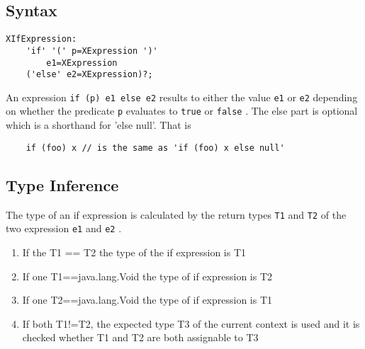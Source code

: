 \documentclass[a4paper,10pt]{scrreprt}
\newlength{\itemindentlen}
\begin{document}
\subsection{Syntax}
\begin{lstlisting}
XIfExpression:
	'if' '(' p=XExpression ')'
		e1=XExpression
	('else' e2=XExpression)?;

\end{lstlisting}


An expression \lstinline{if (p) e1 else e2}
 results to either the value \lstinline{e1}
 or \lstinline{e2}
 depending on whether the predicate \lstinline{p}
 evaluates to \lstinline{true}
 or \lstinline{false}
. 
The else part is optional which is a shorthand for 'else null'.
That is 
\begin{lstlisting}
	if (foo) x // is the same as 'if (foo) x else null' 

\end{lstlisting}





\subsection{Type Inference\label{IfTypeInference}}
The type of an if expression is calculated by the return types \lstinline{T1}
 and \lstinline{T2}
 of the two expression \lstinline{e1}
 and \lstinline{e2}
.

\setlength{\itemindentlen}{\textwidth}
\begin{enumerate}
\addtolength{\itemindentlen}{-2em}

\item \begin{minipage}[t]{\itemindentlen}
If the T1 == T2 the type of the if expression is T1
\end{minipage}

\item \begin{minipage}[t]{\itemindentlen}
If one T1==java.lang.Void the type of if expression is T2
\end{minipage}

\item \begin{minipage}[t]{\itemindentlen}
If one T2==java.lang.Void the type of if expression is T1
\end{minipage}

\item \begin{minipage}[t]{\itemindentlen}
If both T1!=T2, the expected type T3 of the current context is used and it is checked whether T1 and T2 are both assignable to T3
\end{minipage}

\end{enumerate}
\addtolength{\itemindentlen}{2em}
\end{document}
